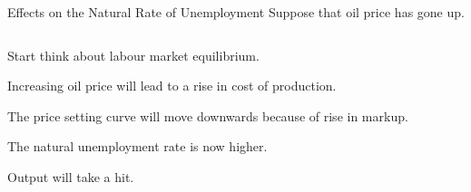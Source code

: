 \documentclass[shownotes,11pt, aspectratio=169]{beamer}
\newenvironment{wideitemize}{\itemize\addtolength{\itemsep}{10pt}}{\enditemize}
\begin{document}
\begin{frame}{Effects on the Natural Rate of Unemployment}
Suppose that oil price has gone up.
\begin{columns}[T] %
\begin{column}{.44\textwidth}
  \begin{wideitemize}
    \item Start think about labour market equilibrium.
    \item Increasing oil price will lead to a rise in cost of production.
    \item The price setting curve will move downwards because of rise in markup.
    \item The natural unemployment rate is now higher.
    \item Output will take a hit. 
  \end{wideitemize}
\end{column}%
\pause
\hfill%
\begin{column}{.53\textwidth}
\end{column}%
\end{columns}
\end{frame}
\end{document}
